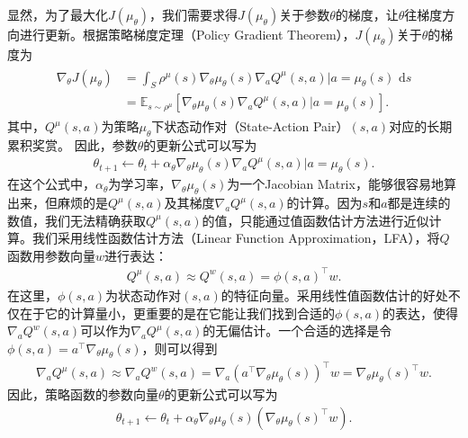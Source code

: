 显然，为了最大化$J({\mu_{\theta}})$，我们需要求得$J({\mu_{\theta}})$关于参数$\theta$的梯度，让$\theta$往梯度方向进行更新。根据策略梯度定理（Policy Gradient Theorem），$J({\mu_{\theta}})$关于$\theta$的梯度为
\begin{align}
 \begin{split} \nabla_{\theta} J(\mu_{\theta}) &=  \int_S \rho^{\mu}(s) \nabla_{\theta} \mu_{\theta}(s) \nabla_a Q^{\mu}(s,a) | a=\mu_{\theta}(s) \text{ d}s \\ &= \mathbb{E}_{s \sim \rho^{\mu}} [\nabla_{\theta} \mu_{\theta}(s) \nabla_a Q^{\mu}(s,a) | a=\mu_{\theta}(s)]. \end{split} 
\end{align}
 其中，$Q^{\mu}(s,a)$为策略$\mu_{\theta}$下状态动作对（State-Action Pair）$(s,a)$对应的长期累积奖赏。 因此，参数$\theta$的更新公式可以写为
\begin{align}
 \theta_{t+1} \leftarrow \theta_{t} + \alpha_{\theta} \nabla_{\theta} \mu_{\theta}(s) \nabla_a Q^{\mu}(s,a) | a=\mu_{\theta}(s). 
\end{align}
 在这个公式中，$\alpha_{\theta}$为学习率，$\nabla_{\theta} \mu_{\theta}(s)$为一个Jacobian Matrix，能够很容易地算出来，但麻烦的是$Q^{\mu}(s,a)$及其梯度$\nabla_a Q^{\mu}(s,a)$的计算。因为$s$和$a$都是连续的数值，我们无法精确获取$Q^{\mu}(s,a)$的值，只能通过值函数估计方法进行近似计算。我们采用线性函数估计方法（Linear Function Approximation，LFA），将$Q$函数用参数向量$w$进行表达：
\begin{align}
 Q^{\mu}(s,a) \approx Q^w(s,a) = \phi(s,a)^{\top} w. 
\end{align}
 在这里，$\phi(s,a)$为状态动作对$(s,a)$的特征向量。采用线性值函数估计的好处不仅在于它的计算量小，更重要的是在它能让我们找到合适的$\phi(s,a)$的表达，使得$\nabla_a Q^w(s,a)$可以作为$\nabla_a Q^{\mu}(s,a)$的无偏估计。一个合适的选择是令$\phi(s,a) = a^{\top} \nabla_{\theta} \mu_{\theta}(s)$，则可以得到
\begin{align}
 \nabla_a Q^{\mu}(s,a) \approx \nabla_a Q^w(s,a) = \nabla_a (a^{\top} \nabla_{\theta} \mu_{\theta}(s))^{\top} w = \nabla_{\theta} \mu_{\theta}(s)^{\top} w. 
\end{align}
 因此，策略函数的参数向量$\theta$的更新公式可以写为
\begin{align}
 \theta_{t+1} \leftarrow \theta_{t} + \alpha_{\theta} \nabla_{\theta} \mu_{\theta}(s) (\nabla_{\theta} \mu_{\theta}(s)^{\top} w). 
\end{align}


